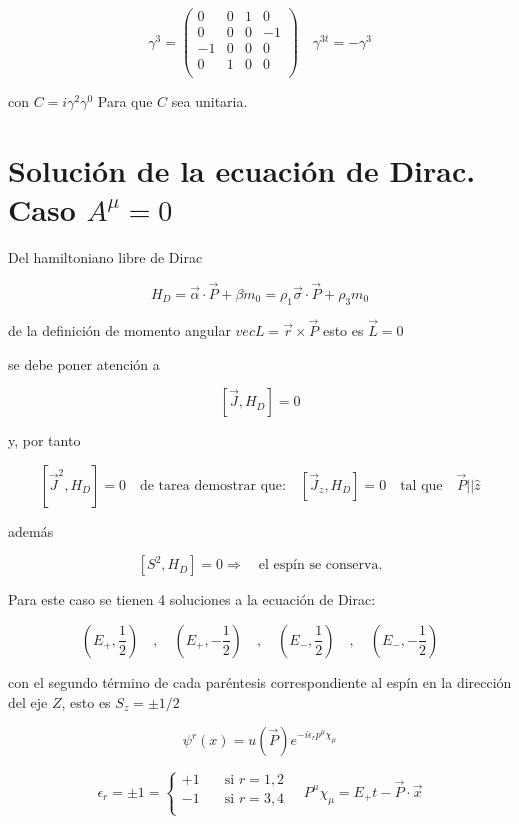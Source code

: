 \documentclass{report}
\begin{document}
\[\gamma^{3} = \left ( \begin{array}{cccc}
 0 & 0 & 1 & 0 \\
 0 & 0 & 0 & -1 \\
 -1 & 0 & 0 & 0 \\
 0 & 1 & 0 & 0 \\ \end{array} \right) 
 \quad \gamma^{3 t} = -\gamma^3
\]

con $C = i \gamma^{2}\gamma^0$ Para que $C$ sea unitaria.

\section{Soluci\'on de la ecuaci\'on de Dirac. Caso $A^{\mu} = 0$}

Del hamiltoniano libre de Dirac

\begin{equation}
H_{D} = \overrightarrow{\alpha} \cdot \overrightarrow{P} + \beta m_{0} = \rho_1 \overrightarrow{\sigma} \cdot \overrightarrow{P} + \rho_3 m_0
\end{equation}

de la definición de momento angular $vec{L} = \vec{r} \times \vec{P}$ esto es $\vec{L} = 0$

se debe poner atención a 

\[[\overrightarrow{J}, H_D]=0\]

y, por tanto

\[[\overrightarrow{J}^{2},H_D] = 0 \quad \text{de tarea demostrar que:} \quad [\overrightarrow{J}_z,H_D]=0 \quad \text{tal que} \quad  \overrightarrow{P}||\hat{z}\] 

además

\[[S^2, H_D]=0 \Rightarrow \quad \text{el esp\'in se conserva.}\]

Para este caso se tienen 4 soluciones a la ecuación de Dirac:

\[(E_+ , \frac{1}{2}) \quad , \quad (E_+ ,-\frac{1}{2}) \quad , \quad (E_- , \frac{1}{2}) \quad , \quad (E_- , - \frac{1}{2})\]

con el segundo término de cada paréntesis correspondiente al espín en la dirección del eje $Z$, esto es $S_{z} = \pm 1/2$

\[\psi^{r}(x) = u (\overrightarrow{P}) e^{-i \epsilon_{r} p^{\mu} \chi _{\mu}}\]

\[\epsilon_{r} = \pm 1  =
  \begin{cases}
    +1       & \quad \text{si }r=1,2\\
    -1  & \quad \text{si } r = 3,4\\
  \end{cases} \quad P^{\mu} \chi_{\mu} = E_{+}t-\overrightarrow{P} \cdot \overrightarrow{x}
\]
\end{document}
